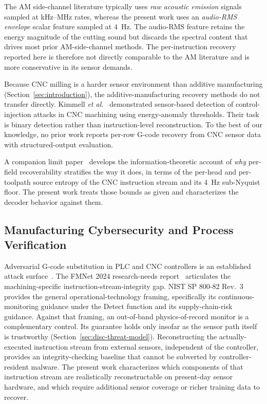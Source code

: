 \documentclass[sensors,article,submit,moreauthors,pdftex]{Definitions/mdpi}
\newcommand{\etal}{\textit{et al.}}
\begin{document}
The AM side-channel literature typically uses \emph{raw acoustic emission} signals sampled at kHz--MHz rates, whereas the present work uses an \emph{audio-RMS envelope} scalar feature sampled at $4$~Hz. The audio-RMS feature retains the energy magnitude of the cutting sound but discards the spectral content that drives most prior AM-side-channel methods. The per-instruction recovery reported here is therefore not directly comparable to the AM literature and is more conservative in its sensor demands.

Because CNC milling is a harder sensor environment than additive manufacturing (Section~\ref{sec:introduction}), the additive-manufacturing recovery methods do not transfer directly. Kimmell \etal~\cite{kimmell2025cnc} demonstrated sensor-based detection of control-injection attacks in CNC machining using energy-anomaly thresholds. Their task is binary detection rather than instruction-level reconstruction. To the best of our knowledge, no prior work reports per-row G-code recovery from CNC sensor data with structured-output evaluation.

A companion limit paper~\cite{paperB_entropy} develops the information-theoretic account of \emph{why} per-field recoverability stratifies the way it does, in terms of the per-head and per-toolpath source entropy of the CNC instruction stream and its 4~Hz sub-Nyquist floor. The present work treats those bounds as given and characterizes the decoder behavior against them.

\subsection{Manufacturing Cybersecurity and Process Verification}
\label{sec:related-security}

Adversarial G-code substitution in PLC and CNC controllers is an established attack surface~\cite{zonouz2014plc,sturm2014cyber,yampolskiy2018security,kimmell2025cnc,belikovetsky2017drowned}. The FMNet 2024 research-needs report~\cite{nist2024fmnet} articulates the machining-specific instruction-stream-integrity gap. NIST SP 800-82 Rev.~3~\cite{nist2023sp80082} provides the general operational-technology framing, specifically its continuous-monitoring guidance under the Detect function and its supply-chain-risk guidance. Against that framing, an out-of-band physics-of-record monitor is a complementary control. Its guarantee holds only insofar as the sensor path itself is trustworthy (Section~\ref{sec:disc-threat-model}). Reconstructing the actually-executed instruction stream from external sensors, independent of the controller, provides an integrity-checking baseline that cannot be subverted by controller-resident malware. The present work characterizes which components of that instruction stream are realistically reconstructable on present-day sensor hardware, and which require additional sensor coverage or richer training data to recover.
\end{document}
